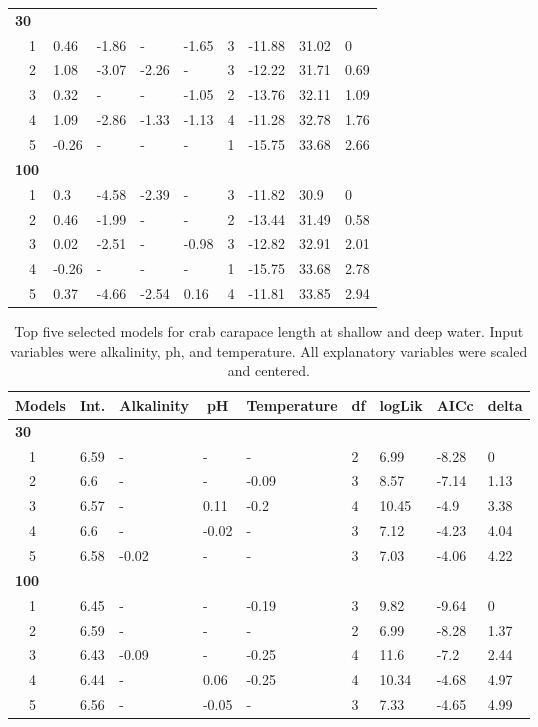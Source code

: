 \documentclass[letterpaper,12pt]{article}\usepackage[]{graphicx}\usepackage[]{color}
\begin{document}
\begin{landscape}
\begin{table}[!tbp]
{\begin{center}
\begin{tabular}{lllllllll}
\hline
{\bfseries 30}&&&&&&&&\tabularnewline
~~1&0.46&-1.86&-&-1.65&3&-11.88&31.02&0\tabularnewline
~~2&1.08&-3.07&-2.26&-&3&-12.22&31.71&0.69\tabularnewline
~~3&0.32&-&-&-1.05&2&-13.76&32.11&1.09\tabularnewline
~~4&1.09&-2.86&-1.33&-1.13&4&-11.28&32.78&1.76\tabularnewline
~~5&-0.26&-&-&-&1&-15.75&33.68&2.66\tabularnewline
\hline
{\bfseries 100}&&&&&&&&\tabularnewline
~~1&0.3&-4.58&-2.39&-&3&-11.82&30.9&0\tabularnewline
~~2&0.46&-1.99&-&-&2&-13.44&31.49&0.58\tabularnewline
~~3&0.02&-2.51&-&-0.98&3&-12.82&32.91&2.01\tabularnewline
~~4&-0.26&-&-&-&1&-15.75&33.68&2.78\tabularnewline
~~5&0.37&-4.66&-2.54&0.16&4&-11.81&33.85&2.94\tabularnewline
\hline
\end{tabular}\end{center}}
\end{table}

\end{landscape}

\begin{landscape}
\centering\vspace*{\fill}
\begin{table}[!tbp]
{\scriptsize
\caption{Top five selected models for crab carapace length at shallow and deep water. Input variables were alkalinity, ph, and temperature.  All explanatory variables were scaled and centered.\label{tab:cltab}} 
\begin{center}
\begin{tabular}{lllllllll}
\hline\hline
\multicolumn{1}{l}{Models}&\multicolumn{1}{c}{Int.}&\multicolumn{1}{c}{Alkalinity}&\multicolumn{1}{c}{pH}&\multicolumn{1}{c}{Temperature}&\multicolumn{1}{c}{df}&\multicolumn{1}{c}{logLik}&\multicolumn{1}{c}{AICc}&\multicolumn{1}{c}{delta}\tabularnewline
\hline
{\bfseries 30}&&&&&&&&\tabularnewline
~~1&6.59&-&-&-&2&6.99&-8.28&0\tabularnewline
~~2&6.6&-&-&-0.09&3&8.57&-7.14&1.13\tabularnewline
~~3&6.57&-&0.11&-0.2&4&10.45&-4.9&3.38\tabularnewline
~~4&6.6&-&-0.02&-&3&7.12&-4.23&4.04\tabularnewline
~~5&6.58&-0.02&-&-&3&7.03&-4.06&4.22\tabularnewline
\hline
{\bfseries 100}&&&&&&&&\tabularnewline
~~1&6.45&-&-&-0.19&3&9.82&-9.64&0\tabularnewline
~~2&6.59&-&-&-&2&6.99&-8.28&1.37\tabularnewline
~~3&6.43&-0.09&-&-0.25&4&11.6&-7.2&2.44\tabularnewline
~~4&6.44&-&0.06&-0.25&4&10.34&-4.68&4.97\tabularnewline
~~5&6.56&-&-0.05&-&3&7.33&-4.65&4.99\tabularnewline
\hline
\end{tabular}\end{center}}
\end{table}

\end{landscape}
\end{document}
